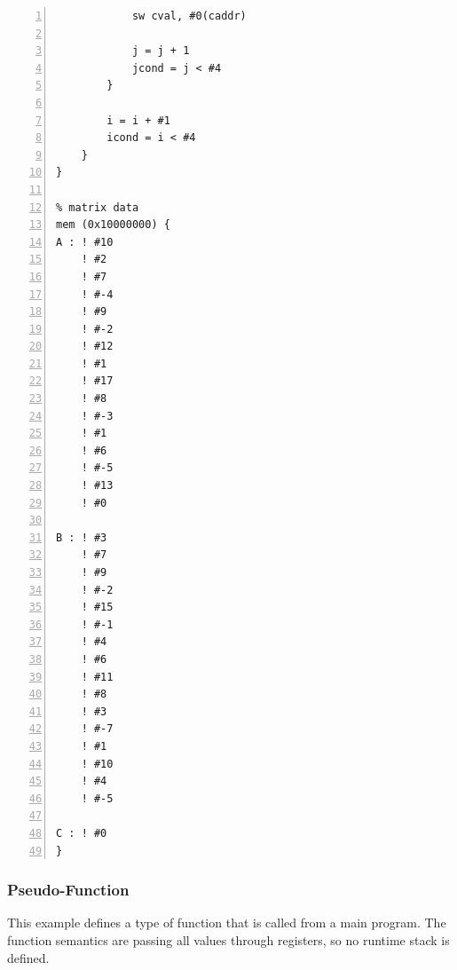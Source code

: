 \begin{lstlisting}[label=code:matmult,caption=Matrix multiplication example source code,basicstyle=\footnotesize,numbers=left,numberstyle=\tiny,stepnumber=1, numbersep=6pt,frame=single,captionpos=b,escapechar=`]
            % store c[i][j]
            sw cval, #0(caddr)

            j = j + 1
            jcond = j < #4
        }

        i = i + #1
        icond = i < #4
    }
}

% matrix data
mem (0x10000000) {
A : ! #10
    ! #2
    ! #7
    ! #-4
    ! #9
    ! #-2
    ! #12
    ! #1
    ! #17
    ! #8
    ! #-3
    ! #1
    ! #6
    ! #-5
    ! #13
    ! #0

B : ! #3
    ! #7
    ! #9
    ! #-2
    ! #15
    ! #-1
    ! #4
    ! #6
    ! #11
    ! #8
    ! #3
    ! #-7
    ! #1
    ! #10
    ! #4
    ! #-5

C : ! #0
}
\end{lstlisting}

\subsubsection{Pseudo-Function}

This example defines a type of function that is called from a 
main program.  The function semantics are passing all values
through registers, so no runtime stack is defined.

